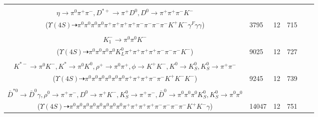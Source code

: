 \documentclass[landscape]{article}
\newcounter{rownumbers}
\newcommand\rn{\stepcounter{rownumbers}\arabic{rownumbers}}
\newcommand{\EOLP}{\\ \hline} %
\newcommand{\topoTags}[1]{#1} %
\begin{document}
\begin{longtable}{clcccc}
\rn & \makecell[l]{ $ 
\Upsilon(4S) \rightarrow B^{0} \bar{B}^{0} ,
B^{0} \rightarrow \rho^{-} K^{+} \gamma^{F} ,
\bar{B}^{0} \rightarrow \pi^{0} \rho^{-} \eta \eta D^{*+} ,
\rho^{-} \rightarrow \pi^{0} \pi^{-} ,
\rho^{-} \rightarrow \pi^{0} \pi^{-} ,
\eta \rightarrow \gamma \gamma ,
$ \\ $
\eta \rightarrow \pi^{0} \pi^{+} \pi^{-} ,
D^{*+} \rightarrow \pi^{+} D^{0} ,
D^{0} \rightarrow \pi^{+} \pi^{+} \pi^{-} K^{-} 
$ \\ ($
\Upsilon(4S) \dashrightarrow \pi^{0} \pi^{0} \pi^{0} \pi^{0} \pi^{+} \pi^{+} \pi^{+} \pi^{+} \pi^{-} \pi^{-} \pi^{-} \pi^{-} K^{+} K^{-} \gamma^{F} \gamma \gamma 
$) } & \topoTags{3795 & }12 & 715 \EOLP

\rn & \makecell[l]{ $ 
\Upsilon(4S) \rightarrow B^{0} \bar{B}^{0} ,
B^{0} \rightarrow \pi^{+} \pi^{-} \eta \omega K^{0} ,
\bar{B}^{0} \rightarrow \pi^{+} K_{1}^{-} ,
\eta \rightarrow \pi^{0} \pi^{+} \pi^{-} ,
\omega \rightarrow \pi^{0} \pi^{+} \pi^{-} ,
K^{0} \rightarrow K_{L}^{0} ,
$ \\ $
K_{1}^{-} \rightarrow \pi^{0} \pi^{0} K^{-} 
$ \\ ($
\Upsilon(4S) \dashrightarrow \pi^{0} \pi^{0} \pi^{0} \pi^{0} K_{L}^{0} \pi^{+} \pi^{+} \pi^{+} \pi^{+} \pi^{-} \pi^{-} \pi^{-} K^{-} 
$) } & \topoTags{9025 & }12 & 727 \EOLP

\rn & \makecell[l]{ $ 
\Upsilon(4S) \rightarrow B^{0} \bar{B}^{0} ,
B^{0} \rightarrow \pi^{-} \bar{D}^{0} D_{s}^{+} ,
\bar{B}^{0} \rightarrow \rho^{+} K^{*-} ,
\bar{D}^{0} \rightarrow \pi^{0} \pi^{0} K^{*} ,
D_{s}^{+} \rightarrow \rho^{+} \phi ,
\rho^{+} \rightarrow \pi^{0} \pi^{+} ,
$ \\ $
K^{*-} \rightarrow \pi^{0} K^{-} ,
K^{*} \rightarrow \pi^{0} K^{0} ,
\rho^{+} \rightarrow \pi^{0} \pi^{+} ,
\phi \rightarrow K^{+} K^{-} ,
K^{0} \rightarrow K_{S}^{0} ,
K_{S}^{0} \rightarrow \pi^{+} \pi^{-} 
$ \\ ($
\Upsilon(4S) \dashrightarrow \pi^{0} \pi^{0} \pi^{0} \pi^{0} \pi^{0} \pi^{0} \pi^{+} \pi^{+} \pi^{+} \pi^{-} \pi^{-} K^{+} K^{-} K^{-} 
$) } & \topoTags{9245 & }12 & 739 \EOLP

\rn & \makecell[l]{ $ 
\Upsilon(4S) \rightarrow B^{0} \bar{B}^{0} ,
B^{0} \rightarrow \pi^{0} \pi^{-} \eta \bar{K}^{0} K^{*+} \bar{D}^{*0} ,
\bar{B}^{0} \rightarrow \rho^{0} D^{0} ,
\eta \rightarrow \pi^{0} \pi^{+} \pi^{-} ,
\bar{K}^{0} \rightarrow K_{S}^{0} ,
K^{*+} \rightarrow \pi^{0} K^{+} ,
$ \\ $
\bar{D}^{*0} \rightarrow \bar{D}^{0} \gamma ,
\rho^{0} \rightarrow \pi^{+} \pi^{-} ,
D^{0} \rightarrow \pi^{+} K^{-} ,
K_{S}^{0} \rightarrow \pi^{+} \pi^{-} ,
\bar{D}^{0} \rightarrow \pi^{0} \pi^{0} \pi^{0} K_{S}^{0} ,
K_{S}^{0} \rightarrow \pi^{0} \pi^{0} 
$ \\ ($
\Upsilon(4S) \dashrightarrow \pi^{0} \pi^{0} \pi^{0} \pi^{0} \pi^{0} \pi^{0} \pi^{0} \pi^{0} \pi^{+} \pi^{+} \pi^{+} \pi^{+} \pi^{-} \pi^{-} \pi^{-} \pi^{-} K^{+} K^{-} \gamma 
$) } & \topoTags{14047 & }12 & 751 \EOLP


\end{longtable}
\end{document}
